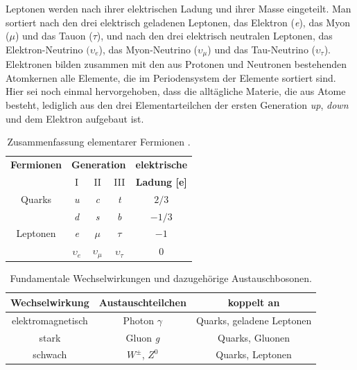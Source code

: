 \documentclass[12pt,a4paper]{report}
\begin{document}
Leptonen werden nach ihrer elektrischen Ladung und ihrer Masse eingeteilt. Man sortiert nach den drei elektrisch geladenen Leptonen, das Elektron (\textit{e}), das Myon ($\mu$) und das Tauon ($\tau$), und nach den drei elektrisch neutralen Leptonen, das Elektron-Neutrino $(\upsilon_{e}$), das Myon-Neutrino ($\upsilon_{\mu}$) und das Tau-Neutrino ($\upsilon_{\tau}$). Elektronen bilden zusammen mit den aus Protonen und Neutronen bestehenden Atom\-kernen alle Elemente, die im Periodensystem der Elemente sortiert sind. Hier sei noch einmal hervorgehoben, dass die alltägliche Materie, die aus Atome besteht, lediglich aus den drei Elementarteilchen der ersten Generation \textit{up}, \textit{down} und dem Elektron aufgebaut ist. \\
\begin{table}
\centering
\begin{tabular}{|c|c|c|c|c|}
\hline
\multicolumn{1}{|c|}{\textbf{Fermionen}} & \multicolumn{3}{|c|}{\textbf{Generation}} & \multicolumn{1}{|c|}{\textbf{elektrische}} \\
\cline{2-4}
& I & II & III & \textbf{Ladung [e]} \\
\hline
\hline
Quarks & \textit{u} & \textit{c} & \textit{t} & $2/3$\\ 
\cline{2-5}
& \textit{d} & \textit{s} & \textit{b} & $-1/3$\\ 
\hline
\hline
Leptonen & \textit{e} & $\mu$ & $\tau$ & $-1$\\ 
\cline{2-5}
& $\upsilon_{e}$ & $\upsilon_{\mu}$ & $\upsilon_{\tau}$ & $0$\\ 
\hline
\end{tabular}
\caption{Zusammenfassung elementarer Fermionen \cite{pdg2014particle}.}
\label{tab:elementareFermionen}
\end{table} 
\begin{table}
\centering
\begin{tabular}{|c|c|c|}
\hline
\textbf{Wechselwirkung} & \textbf{Austauschteilchen} & \textbf{koppelt an}\\
\hline
\hline
elektromagnetisch & Photon $\gamma$ & Quarks, geladene Leptonen\\
\hline
stark & Gluon \textit{g} & Quarks, Gluonen\\
\hline
schwach & $W^{\pm}$, $Z^{0}$ & Quarks, Leptonen\\
\hline
\end{tabular}
\caption{Fundamentale Wechselwirkungen und dazugehörige Austauschbosonen.}
\label{tab:Wechselwirkungen}
\end{table}
\end{document}
